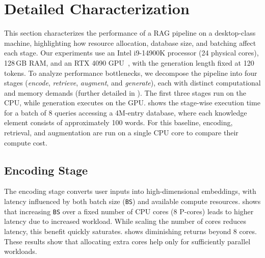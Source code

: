 \section{Detailed Characterization}
\label{sec:03Characterization}

This section characterizes the performance of a RAG pipeline on a desktop-class machine, highlighting how resource allocation, database size, and batching affect each stage. Our experiments use an Intel i9-14900K processor (24 physical cores), 128\,GB RAM, and an RTX 4090 GPU~\cite{intel_cpu,nvidia_rtx_gpu}, with the generation length fixed at 120 tokens. To analyze performance bottlenecks, we decompose the pipeline into four stages (\emph{encode}, \emph{retrieve}, \emph{augment}, and \emph{generate}), each with distinct computational and memory demands (further detailed in ). The first three stages run on the CPU, while generation executes on the GPU.  shows the stage-wise execution time for a batch of 8 queries accessing a 4M-entry database, where each knowledge element consists of approximately 100 words. For this baseline, encoding, retrieval, and augmentation are run on a single CPU core to compare their compute cost.

\subsection{Encoding Stage}
\label{sec:char:Encoding}
The encoding stage converts user inputs into high-dimensional embeddings, with latency influenced by both batch size (\texttt{BS}) and available compute resources.  shows that increasing \texttt{BS} over a fixed number of CPU cores (8 P-cores) leads to higher latency due to increased workload. While scaling the number of cores reduces latency, this benefit quickly saturates.  shows diminishing returns beyond 8 cores. These results show that allocating extra cores help only for sufficiently parallel workloads.%

